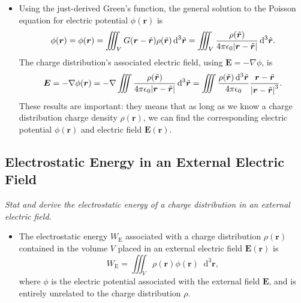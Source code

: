 \documentclass[11pt, a4paper]{article}
\newcommand{\diff}{\mathop{}\!\mathrm{d}} %
\newcommand{\dr}{\diff^{3} \r}  %
\newcommand{\dtr}{\diff^{3} \tilde{\r}}  %
\renewcommand{\vec}[1]{\bm{#1}} %
\renewcommand{\t}[1]{\tilde{#1}} %
\renewcommand{\r}{\vec{r}}
\newcommand{\E}{\vec{E}} %
\newcommand{\ee}{\epsilon_{0}}  %
\renewcommand{\grad}{\nabla}
\begin{document}
\begin{itemize}
	\item  Using the just-derived Green's function, the general solution to the Poisson equation for electric potential $ \phi(\r) $  is
	\begin{equation*}
		\phi(\r) = \phi(\r) = \iiint_{V} G(\r - \t{\r})\rho(\t{\r}) \dtr = \iiint_{V} \frac{\rho(\t{\r})}{4\pi \ee \abs{\r - \t{\r}}}\dtr.
	\end{equation*}
    The charge distribution's associated electric field, using $ \E = - \grad \phi $, is
	\begin{equation*}
		\E = - \grad \phi(\r) = - \grad \iiint \frac{\rho(\t{\r})}{4\pi \ee \abs{\r - \t{\r}}}\dtr = \iiint \frac{\rho(\t{\r})\dtr}{4\pi \ee} \frac{\r - \t{\r}}{\abs{\r - \t{\r}}^{3}}.
	\end{equation*}
    These results are important: they means that as long as we know a charge distribution charge density $ \rho(\r) $, we can find the corresponding electric potential $ \phi(\r) $ and electric field $ \E(\r) $. 
	
	
\end{itemize}

\subsection{Electrostatic Energy in an External Electric Field}
\textit{Stat and derive the electrostatic energy of a charge distribution in an external electric field.}

\begin{itemize}
    \item The electrostatic energy $ W_{\text{E}} $ associated with a charge distribution $ \rho(\r) $ contained in the volume $ V $ placed in an external electric field $ \E(\r) $ is
    \begin{equation*}
        W_{\text{E}} = \iiint_{V} \rho(\r) \phi(\r) \dr,
    \end{equation*}
    where $ \phi $ is the electric potential associated with the external field $ \E $, and is entirely unrelated to the charge distribution $ \rho $.
    
\end{itemize}
\end{document}
